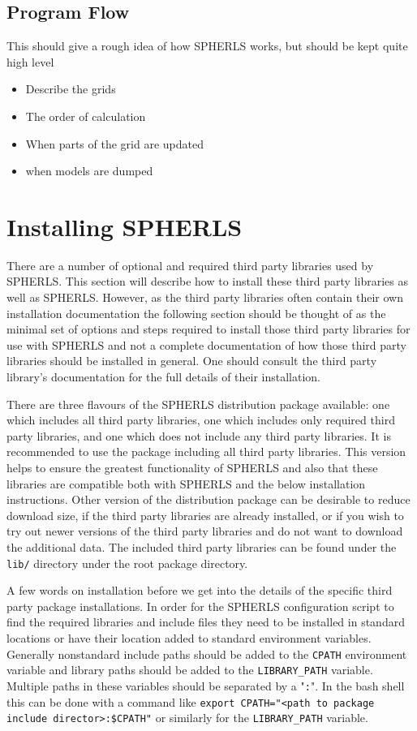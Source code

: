 \documentclass[12pt,a4paper]{book}
\begin{document}
\section{Program Flow}
This should give a rough idea of how SPHERLS works, but should be kept quite high level
\begin{itemize}
\item Describe the grids
\item The order of calculation
\item When parts of the grid are updated
\item when models are dumped
\end{itemize}

\chapter{Installing SPHERLS}

There are a number of optional and required third party libraries used by SPHERLS. This section will describe how to install these third party libraries as well as SPHERLS. However, as the third party libraries often contain their own installation documentation the following section should be thought of as the minimal set of options and steps required to install those third party libraries for use with SPHERLS and not a complete documentation of how those third party libraries should be installed in general. One should consult the third party library's documentation for the full details of their installation.

There are three flavours of the SPHERLS distribution package available: one which includes all third party libraries, one which includes only required third party libraries, and one which does not include any third party libraries. It is recommended to use the package including all third party libraries. This version helps to ensure the greatest functionality of SPHERLS and also that these libraries are compatible both with SPHERLS and the below installation instructions. Other version of the distribution package can be desirable to reduce download size, if the third party libraries are already installed, or if you wish to try out newer versions of the third party libraries and do not want to download the additional data. The included third party libraries can be found under the {\tt lib/} directory under the root package directory.

A few words on installation before we get into the details of the specific third party package installations. In order for the SPHERLS configuration script to find the required libraries and include files they need to be installed in standard locations or have their location added to standard environment variables. Generally nonstandard include paths should be added to the {\tt CPATH} environment variable and library paths should be added to the {\tt LIBRARY\_PATH} variable. Multiple paths in these variables should be separated by a "{\tt :}". In the bash shell this can be done with a command like {\tt export CPATH="<path to package include director>:\$CPATH"} or similarly for the {\tt LIBRARY\_PATH} variable.
\end{document}
